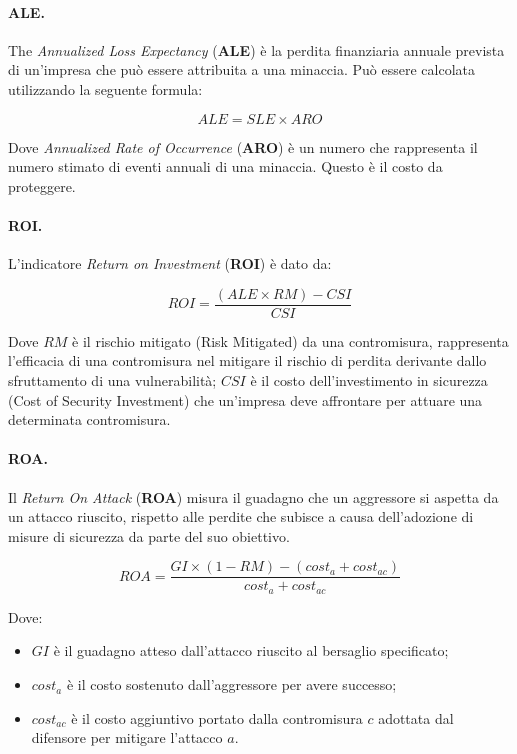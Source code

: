 \paragraph{ALE.}
The \textit{Annualized Loss Expectancy} (\textbf{ALE}) è la perdita finanziaria
annuale prevista di un'impresa che
può essere attribuita a una minaccia.
Può essere calcolata utilizzando la seguente formula:

\[
    ALE = SLE \times ARO
\]

Dove \textit{Annualized Rate of Occurrence} (\textbf{ARO}) è un numero
che rappresenta il numero stimato di eventi annuali di una
minaccia. Questo è il costo da proteggere.

\paragraph{ROI.}
L'indicatore \textit{Return on Investment} (\textbf{ROI}) è dato da:

\[
    ROI = \frac{(ALE \times RM) - CSI}{CSI}
\]

Dove \(RM\) è il rischio mitigato (Risk Mitigated) da una
contromisura, rappresenta l'efficacia di una contromisura nel
mitigare il rischio di perdita derivante dallo sfruttamento di una
vulnerabilità; \(CSI\) è il costo dell'investimento in sicurezza
(Cost of Security Investment) che un'impresa
deve affrontare per attuare una determinata contromisura.

\paragraph{ROA.}
Il \textit{Return On Attack} (\textbf{ROA}) misura il guadagno che un aggressore
si aspetta da un attacco riuscito, rispetto alle perdite che subisce a causa
dell'adozione di misure di sicurezza da parte del suo obiettivo.

\[
    ROA = \frac{GI \times (1 - RM) - (cost_a + cost_{ac})}{cost_a + cost_{ac}}
\]

Dove:

\begin{itemize}
    \item \(GI\) è il guadagno atteso dall'attacco riuscito al bersaglio
          specificato;
    \item \(cost_{a}\) è il costo sostenuto dall'aggressore per avere successo;
    \item \(cost_{ac}\) è il costo aggiuntivo portato dalla contromisura \(c\)
          adottata dal difensore per mitigare
          l'attacco \(a\).
\end{itemize}

